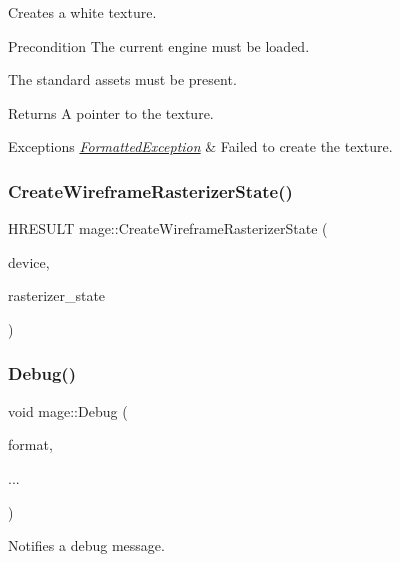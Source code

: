 Creates a white texture.

\begin{DoxyPrecond}{Precondition}
The current engine must be loaded. 

The standard assets must be present. 
\end{DoxyPrecond}
\begin{DoxyReturn}{Returns}
A pointer to the texture. 
\end{DoxyReturn}

\begin{DoxyExceptions}{Exceptions}
{\em \hyperlink{structmage_1_1_formatted_exception}{Formatted\+Exception}} & Failed to create the texture. \\
\hline
\end{DoxyExceptions}
\hypertarget{namespacemage_a697c6623ef997684945849dc04437a1a}{}\label{namespacemage_a697c6623ef997684945849dc04437a1a} 
\subsubsection{\texorpdfstring{Create\+Wireframe\+Rasterizer\+State()}{CreateWireframeRasterizerState()}}
{\footnotesize\ttfamily H\+R\+E\+S\+U\+LT mage\+::\+Create\+Wireframe\+Rasterizer\+State (\begin{DoxyParamCaption}\item[{I\+D3\+D11\+Device2 $\ast$}]{device,  }\item[{I\+D3\+D11\+Rasterizer\+State $\ast$$\ast$}]{rasterizer\+\_\+state }\end{DoxyParamCaption})}

\hypertarget{namespacemage_a1bcf1f0301e170105908eee5b5c46830}{}\label{namespacemage_a1bcf1f0301e170105908eee5b5c46830} 
\subsubsection{\texorpdfstring{Debug()}{Debug()}}
{\footnotesize\ttfamily void mage\+::\+Debug (\begin{DoxyParamCaption}\item[{const char $\ast$}]{format,  }\item[{}]{... }\end{DoxyParamCaption})}

Notifies a debug message.

